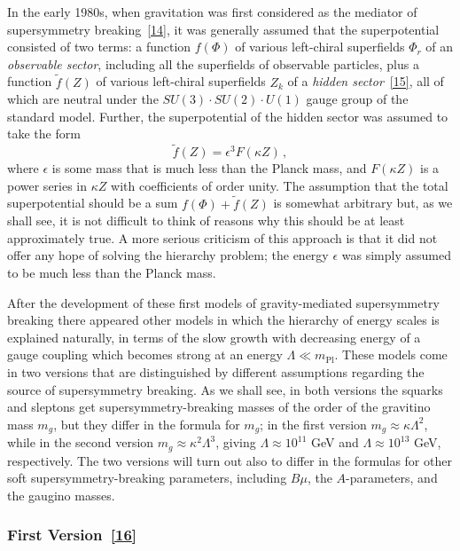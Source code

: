 In the early 1980s, when gravitation was first considered as the mediator of
supersymmetry breaking~\hyperref[ch31-ref-14]{[14]}, it was generally assumed
that the superpotential consisted of two terms: a function \(f(\Phi)\) of
various left-chiral superfields \(\Phi_r\) of an \emph{observable sector},
including all the superfields of observable particles, plus a function
\(\widetilde f(Z)\) of various left-chiral superfields \(Z_k\) of a
\emph{hidden sector}~\hyperref[ch31-ref-15]{[15]}, all of which are neutral
under the \(SU(3)\cdot SU(2)\cdot U(1)\) gauge group of the standard model.
Further, the superpotential of the hidden sector was assumed to take the
form
\begin{equation}
  \widetilde f(Z)=\epsilon^3 F(\kappa Z)\,,
  \tag{31.7.1}\label{eq:31.7.1}
\end{equation}
where \(\epsilon\) is some mass that is much less than the Planck mass, and
\(F(\kappa Z)\) is a power series in \(\kappa Z\) with coefficients of order
unity. The assumption that the total superpotential should be a sum
\(f(\Phi)+\widetilde f(Z)\) is somewhat arbitrary but, as we shall see, it is
not difficult to think of reasons why this should be at least approximately
true. A more serious criticism of this approach is that it did not offer any
hope of solving the hierarchy problem; the energy \(\epsilon\) was simply
assumed to be much less than the Planck mass.

After the development of these first models of gravity-mediated
supersymmetry breaking there appeared other models in which the hierarchy
of energy scales is explained naturally, in terms of the slow growth with
decreasing energy of a gauge coupling which becomes strong at an energy
\(\Lambda\ll m_{\mathrm{Pl}}\). These models come in two versions that are
distinguished by different assumptions regarding the source of
supersymmetry breaking. As we shall see, in both versions the squarks and
sleptons get supersymmetry-breaking masses of the order of the gravitino
mass \(m_g\), but they differ in the formula for \(m_g\); in the first
version \(m_g\approx\kappa\Lambda^2\), while in the second version
\(m_g\approx\kappa^2\Lambda^3\), giving \(\Lambda\approx10^{11}\) GeV and
\(\Lambda\approx10^{13}\) GeV, respectively. The two versions will turn out
also to differ in the formulas for other soft supersymmetry-breaking
parameters, including \(B\mu\), the \(A\)-parameters, and the gaugino
masses.

\subsubsection*{First Version~\hyperref[ch31-ref-16]{[16]}}

